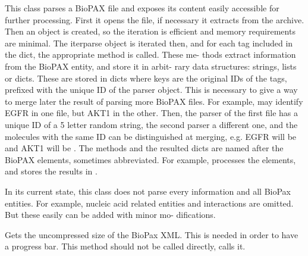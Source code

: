 \documentclass[letterpaper,10pt,english]{sphinxmanual}
\begin{document}
\begin{fulllineitems}
\label{\detokenize{reference:pypath.pyreact.BioPaxReader}}
This class parses a BioPAX file and exposes its content easily accessible
for further processing. First it opens the file, if necessary it extracts
from the archive. Then an  object is created, so the
iteration is efficient and memory requirements are minimal. The iterparse
object is iterated then, and for each tag included in the
 dict, the appropriate method is called. These me-
thods extract information from the BioPAX entity, and store it in arbit-
rary data structures: strings, lists or dicts. These are stored in dicts
where keys are the original IDs of the tags, prefixed with the unique ID
of the parser object. This is necessary to give a way to merge later the
result of parsing more BioPAX files. For example,  may identify
EGFR in one file, but AKT1 in the other. Then, the parser of the first
file has a unique ID of a 5 letter random string, the second parser a
different one, and the molecules with the same ID can be distinguished
at merging, e.g. EGFR will be  and AKT1 will be .
The methods and the resulted dicts are named after the BioPAX elements,
sometimes abbreviated. For example,  processes
the  elements, and stores the results in
.

In its current state, this class does not parse every information and
all BioPax entities. For example, nucleic acid related entities and
interactions are omitted. But these easily can be added with minor mo-
difications.

\begin{fulllineitems}
\label{\detokenize{reference:pypath.pyreact.BioPaxReader.biopax_size}}
Gets the uncompressed size of the BioPax XML. This is needed in
order to have a progress bar. This method should not be called
directly,  calls it.


\end{fulllineitems}
\end{fulllineitems}
\end{document}
